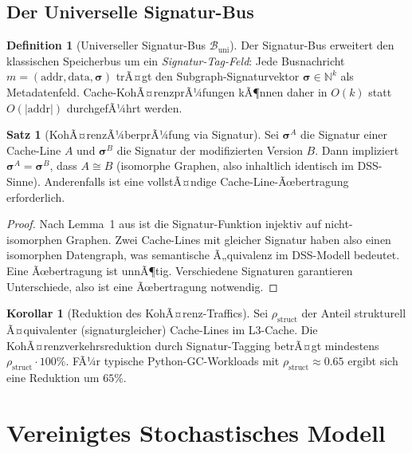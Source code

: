 ﻿\documentclass[a4paper,12pt]{article}
\theoremstyle{definition}
\newtheorem{definition}{Definition}[section]
\newtheorem{satz}{Satz}[section]
\newtheorem{korollar}{Korollar}[section]
\begin{document}
\subsection{Der Universelle Signatur-Bus}

\begin{definition}[Universeller Signatur-Bus $\mathcal{B}_{\mathrm{uni}}$]
  \label{def:sigbus}
  Der Signatur-Bus erweitert den klassischen Speicherbus um ein
  \emph{Signatur-Tag-Feld}: Jede Busnachricht $m = (\mathrm{addr}, \mathrm{data},
  \boldsymbol{\sigma})$ trÃ¤gt den Subgraph-Signaturvektor
  $\boldsymbol{\sigma} \in \mathbb{N}^k$ als Metadatenfeld.
  Cache-KohÃ¤renzprÃ¼fungen kÃ¶nnen daher in $O(k)$ statt $O(|\mathrm{addr}|)$
  durchgefÃ¼hrt werden.
\end{definition}

\begin{satz}[KohÃ¤renzÃ¼berprÃ¼fung via Signatur]
  \label{satz:kohaerenz}
  Sei $\boldsymbol{\sigma}^A$ die Signatur einer Cache-Line $A$ und
  $\boldsymbol{\sigma}^B$ die Signatur der modifizierten Version $B$.
  Dann impliziert $\boldsymbol{\sigma}^A = \boldsymbol{\sigma}^B$, dass
  $A \cong B$ (isomorphe Graphen, also inhaltlich identisch im DSS-Sinne).
  Anderenfalls ist eine vollstÃ¤ndige Cache-Line-Ãœbertragung erforderlich.
\end{satz}

\begin{proof}
  Nach Lemma~1 aus \cite{epp2026dnastor} ist die Signatur-Funktion injektiv
  auf nicht-isomorphen Graphen. Zwei Cache-Lines mit gleicher Signatur
  haben also einen isomorphen Datengraph, was semantische Ã„quivalenz
  im DSS-Modell bedeutet. Eine Ãœbertragung ist unnÃ¶tig. Verschiedene
  Signaturen garantieren Unterschiede, also ist eine Ãœbertragung notwendig.
\end{proof}

\begin{korollar}[Reduktion des KohÃ¤renz-Traffics]
  \label{kor:kohaerenz_traffic}
  Sei $\rho_{\mathrm{struct}}$ der Anteil strukturell Ã¤quivalenter
  (signaturgleicher) Cache-Lines im L3-Cache. Die KohÃ¤renzverkehrsreduktion
  durch Signatur-Tagging betrÃ¤gt mindestens $\rho_{\mathrm{struct}} \cdot 100\%$.
  FÃ¼r typische Python-GC-Workloads mit $\rho_{\mathrm{struct}} \approx 0.65$
  ergibt sich eine Reduktion um $65\%$.
\end{korollar}

\section{Vereinigtes Stochastisches Modell}
\end{document}

